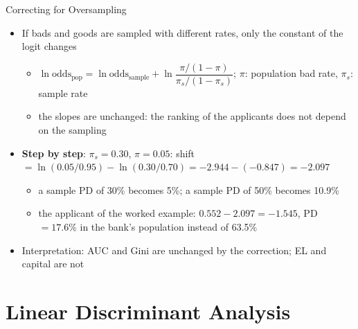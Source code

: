 \begin{frame}{Correcting for Oversampling}
\itemsize{\small}
\begin{itemize}
    \item If bads and goods are sampled with different rates, only the constant of the logit changes
    \begin{itemize}
        \item $\ln\mathrm{odds}_{\text{pop}} = \ln\mathrm{odds}_{\text{sample}} + \ln\dfrac{\pi/(1 - \pi)}{\pi_s/(1 - \pi_s)}$; $\pi$: population bad rate, $\pi_s$: sample rate
        \item the slopes are unchanged: the ranking of the applicants does not depend on the sampling
    \end{itemize}
    \item \textbf{Step by step}: $\pi_s = 0.30$, $\pi = 0.05$: shift $= \ln(0.05/0.95) - \ln(0.30/0.70) = -2.944 - (-0.847) = -2.097$
    \begin{itemize}
        \item a sample PD of 30\% becomes 5\%; a sample PD of 50\% becomes 10.9\%
        \item the applicant of the worked example: $0.552 - 2.097 = -1.545$, PD $= 17.6\%$ in the bank's population instead of 63.5\%
    \end{itemize}
    \item Interpretation: AUC and Gini are unchanged by the correction; EL and capital are not
\end{itemize}
\end{frame}


\section{Linear Discriminant Analysis}

